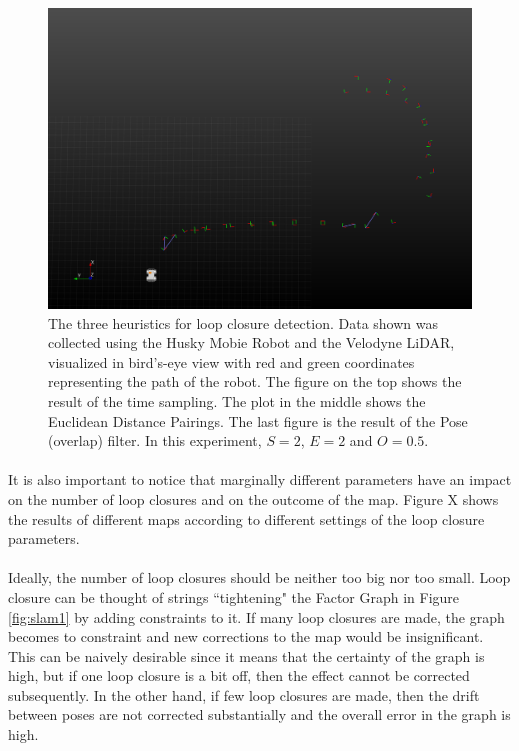 \documentclass[11pt]{article}
\begin{document}
\begin{figure}
\begin{minipage}{0.67\textwidth}
				\includegraphics[width=\textwidth]{LoopClosureFinal}
	\end{minipage}\hfill
	\begin{minipage}{0.33\textwidth}
		\centering
		\caption[t]{The three heuristics for loop closure detection. Data shown was collected using the Husky Mobie Robot and the Velodyne LiDAR, visualized in bird's-eye view with red and green coordinates representing the path of the robot. The figure on the top shows the result of the time sampling. The plot in the middle shows the Euclidean Distance Pairings. The last figure is the result of the Pose (overlap) filter. In this experiment, $S=2$, $E=2$ and $O=0.5$.}
		\label{fig:loopClosureDetection}
	\end{minipage}
	\end{figure}
	\paragraph{}
	It is also important to notice that marginally different parameters have an impact on the number of loop closures and on the outcome of the map. Figure X shows the results of different maps according to different settings of the loop closure parameters.
	
	\paragraph{}
	Ideally, the number of loop closures should be neither too big nor too small. Loop closure can be thought of strings ``tightening" the Factor Graph in Figure \ref{fig:slam1} by adding constraints to it. If many loop closures are made, the graph becomes to constraint and new corrections to the map would be insignificant. This can be naively desirable since it means that the certainty of the graph is high, but if one loop closure is a bit off, then the effect cannot be corrected subsequently. In the other hand, if few loop closures are made, then the drift between poses are not corrected substantially and the overall error in the graph is high.
	
\end{document}

